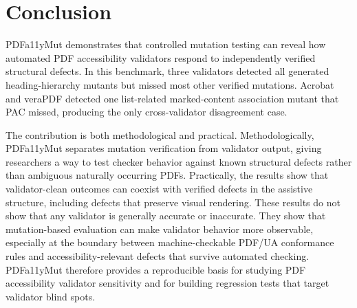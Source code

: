 \documentclass[conference]{IEEEtran}
\begin{document}
\section{Conclusion}

PDFa11yMut demonstrates that controlled mutation testing can reveal how automated PDF accessibility validators respond to independently verified structural defects. In this benchmark, three validators detected all generated heading-hierarchy mutants but missed most other verified mutations. Acrobat and veraPDF detected one list-related marked-content association mutant that PAC missed, producing the only cross-validator disagreement case.

The contribution is both methodological and practical. Methodologically, PDFa11yMut separates mutation verification from validator output, giving researchers a way to test checker behavior against known structural defects rather than ambiguous naturally occurring PDFs. Practically, the results show that validator-clean outcomes can coexist with verified defects in the assistive structure, including defects that preserve visual rendering. These results do not show that any validator is generally accurate or inaccurate. They show that mutation-based evaluation can make validator behavior more observable, especially at the boundary between machine-checkable PDF/UA conformance rules and accessibility-relevant defects that survive automated checking. PDFa11yMut therefore provides a reproducible basis for studying PDF accessibility validator sensitivity and for building regression tests that target validator blind spots.
\end{document}
